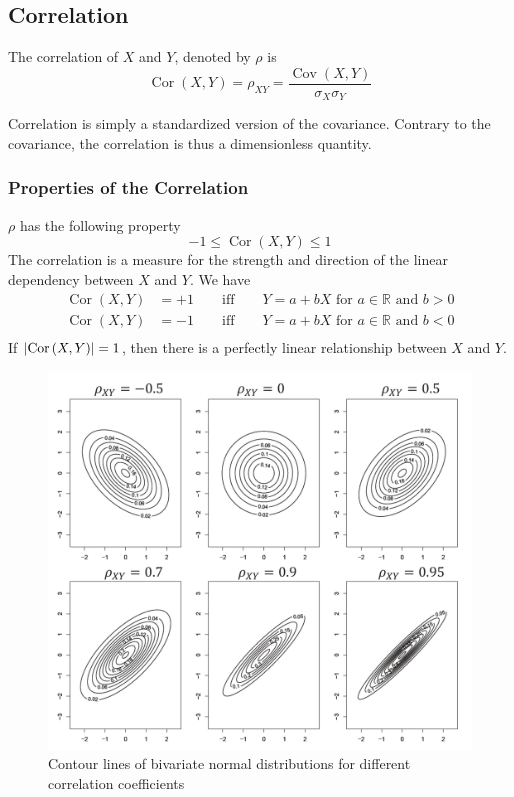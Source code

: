 \documentclass[11pt]{article}
\theoremstyle{definition}
\newcommand*\R{\mathbb{R}}
\newcommand*\Cov[1]{\mathop{\text{Cov}}\left(#1\right)}
\newcommand*\Cor[1]{\mathop{\text{Cor}}\left(#1\right)}
\DeclarePairedDelimiter\abs{\lvert}{\rvert}
\begin{document}
\subsection{Correlation}
\begin{definition}
	The correlation of $X$ and $Y$, denoted by $\rho$ is
	\begin{equation*}
		\Cor{X,Y} = \rho_{XY} = \frac{\Cov{X,Y}}{\sigma_X\sigma_Y}
	\end{equation*}
\end{definition}
Correlation is simply a standardized version of the covariance. Contrary to the covariance, the correlation is thus a dimensionless quantity. 

\subsubsection{Properties of the Correlation}
$\rho$ has the following property
\begin{equation*}
	-1 \leq \Cor{X,Y} \leq 1
\end{equation*}
The correlation is a measure for the strength and direction of the linear dependency between $X$ and $Y$. We have
\begin{align*}
	\Cor{X,Y} &= +1 \qquad\text{iff}\qquad Y=a+bX \text{ for $a\in\R$ and $b>0$}\\
	\Cor{X,Y} &= -1 \qquad\text{iff}\qquad Y=a+bX \text{ for $a\in\R$ and $b<0$}\\
\end{align*}
If $\abs{\Cor{X,Y}} = 1$, then there is a perfectly linear relationship between $X$ and $Y$.
\begin{figure}[tbh]
	\centering
	\includegraphics[width=0.6\linewidth]{img/correlation_contour_lines}
	\caption{Contour lines of bivariate normal distributions for different correlation coefficients}
	\label{fig:correlationcontourlines}
\end{figure}
\end{document}
